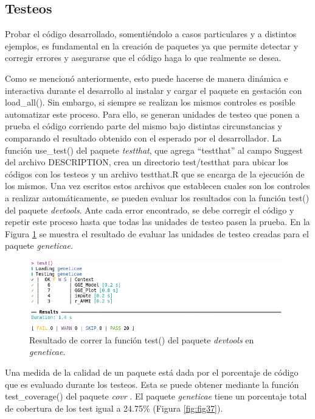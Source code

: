 \subsection{Testeos}

Probar el código desarrollado, somentiéndolo a casos particulares y a distintos ejemplos, es fundamental en la creación de paquetes ya que permite detectar y corregir errores y asegurarse que el código haga lo que realmente se desea.

Como se mencionó anteriormente, esto puede hacerse de manera dinámica e interactiva durante el desarrollo al instalar y cargar el paquete en gestación con \textcolor{fandango}{load\_all()}. Sin embargo, si siempre se realizan los mismos controles es posible automatizar este proceso. Para ello, se generan unidades de testeo que ponen a prueba el código corriendo parte del mismo bajo distintas circunstancias y comparando el resultado obtenido con el esperado por el desarrollador.  La función \textcolor{fandango}{use\_test()} del paquete \emph{testthat}, que agrega ``testthat'' al campo Suggest del archivo DESCRIPTION, crea un directorio test/testthat para ubicar los códigos con los testeos y un archivo testthat.R que se encarga de la ejecución de los mismos. Una vez escritos estos archivos que establecen cuales son los controles a realizar automáticamente, se pueden evaluar los resultados con la función \textcolor{fandango}{test()} del paquete \emph{devtools}. Ante cada error encontrado, se debe corregir el código y repetir este proceso hasta que todas las unidades de testeo pasen la prueba. En la Figura \ref{fig:fig36} se muestra el resultado de evaluar las unidades de testeo creadas para el paquete \emph{geneticae}.

\begin{figure}[h]
	\begin{center}
		\includegraphics[width=11cm]{./Graficos/Test.png}	
	\end{center}
	\caption{Resultado de correr la función \textcolor{fandango}{test()} del paquete \emph{devtools} en \emph{geneticae}.}
	\label{fig:fig36}
\end{figure}

Una medida de la calidad de un paquete está dada por el porcentaje de código que es evaluado durante los testeos. Esta se puede obtener mediante la función \textcolor{fandango}{test\_coverage()} del paquete \emph{covr} \citep{Hester2020}. El paquete \emph{geneticae} tiene un porcentaje total de cobertura de los test igual a 24.75\% (Figura \ref{fig:fig37}).

